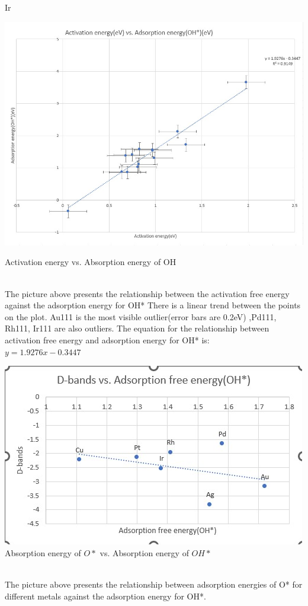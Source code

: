 Ir\documentclass{article}
\begin{document}
\begin{center}
\includegraphics{6.2.a.jpg}
\caption{Activation energy vs. Absorption energy of OH}
\end{center}
 \\
The picture above presents the relationship between the activation free energy against the adsorption energy for OH*
There is a linear trend between the points on the plot. Au111 is the most visible outlier(error bars are 0.2eV) ,Pd111, Rh111, Ir111 are also outliers.
The equation for the relationship between activation free energy and adsorption energy for OH* is:\\
$y=1.9276x-0.3447$\\

\begin{center}
\includegraphics{pictures/6.2.b.jpg} \\
\caption{Absorption energy of $O\ast$ vs. Absorption energy of $OH\ast$}
\end{center}
 \\
The picture above presents the relationship between adsorption energies of O* for different metals against the adsorption energy for OH*. \\
\end{document}
